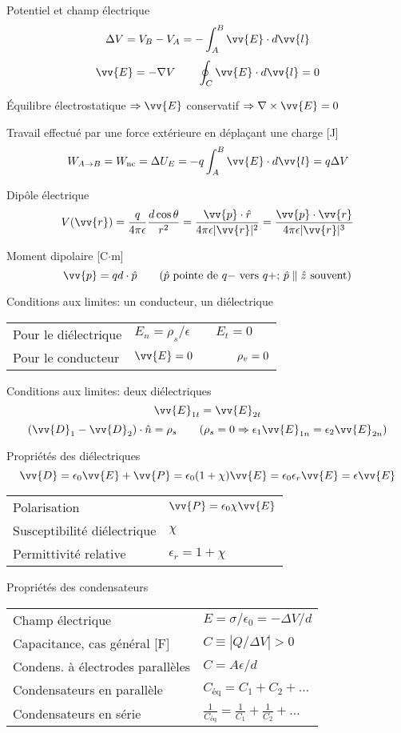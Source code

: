 \documentclass[10pt,landscape]{article}
\newcommand{\extraline}{\vspace{1em}}
\newcommand{\halfline}{\vspace{0.5em}}
\begin{document}
\begin{multicols}{3}
Potentiel et champ électrique
\[ \Delta V = V_B - V_A  = -\int_A^B \vv{E}\cdot d\vv{l} \]
\[ \vv{E} = -\nabla V 
 \qquad \oint_C \vv{E}\cdot d\vv{l}  = 0 \]

Équilibre électrostatique $\Rightarrow \vv{E}$ conservatif  $\Rightarrow \nabla \times \vv{E} = 0$

\extraline
Travail effectué par une force extérieure en déplaçant une charge [J]
\[ W_{A\rightarrow B} = W_\text{nc} = \Delta U_E = -q\int_{A}^{B} \vv{E}\cdot d\vv{l} = q\Delta V \]

Dipôle électrique
\[ V(\vv{r}) = \frac{q}{4\pi\epsilon} \frac{d\cos\theta}{r^2} =
\frac{\vv{p}\cdot\hat{r}}{4\pi\epsilon|\vv{r}|^2} =
\frac{\vv{p}\cdot\vv{r}}{4\pi\epsilon|\vv{r}|^3} \]

Moment dipolaire [C$\cdot$m]
\[ \vv{p} = qd\cdot \hat{p} \qquad \text{($\hat{p}$ pointe de $q-$ vers $q+$;  $\hat{p}\parallel\hat{z}$ souvent)} \]

\halfline
Conditions aux limites: un conducteur, un diélectrique  \\
\halfline
\begin{tabular}{@{}ll@{}}
	Pour le diélectrique & $ E_n = {\rho_s}/{\epsilon} \qquad E_t = 0 $ \\
	Pour le conducteur  & $\vv{E} = 0 \qquad\qquad \rho_v = 0 $ \\
\end{tabular}

\extraline
Conditions aux limites: deux diélectriques
\[ \vv{E}_{1t} =\vv{ E}_{2t}  \]
\[ (\vv{D}_1 - \vv{D}_2) \cdot \hat{n} = \rho_s  \qquad (\rho_s=0 \Rightarrow \epsilon_1 \vv{E}_{1n} = \epsilon_2 \vv{E}_{2n}) \] 

\halfline
Propriétés des diélectriques
\[ \vv{D} = \epsilon_0\vv{E} + \vv{P} = \epsilon_0(1+\chi)\vv{E} = \epsilon_0\epsilon_r\vv{E} = \epsilon\vv{E}  \]
\begin{tabular}{@{}ll@{}}
	Polarisation  & $\vv{P} = \epsilon_0\chi\vv{E}$ \\
	Susceptibilité diélectrique  & $\chi$ \\
	Permittivité relative &  $\epsilon_r=1+\chi$
\end{tabular}

\extraline
Propriétés des condensateurs  \\
\halfline
\begin{tabular}{@{}ll@{}}
	Champ électrique & $ E = {\sigma}/{\epsilon_0}  = -{\Delta V}/{d} $ \\
	Capacitance, cas général [F] & $C \equiv  | {Q}/{\Delta V} | > 0 $ \\
	Condens. à électrodes parallèles & $C = {A\epsilon}/{d} $ \\
	Condensateurs en parallèle  & $C_\text{éq} = C_1 + C_2 + \dots$ \\
	Condensateurs en série & $\frac{1}{C_\text{éq}} = \frac{1}{C_1} + \frac{1}{C_2} + \dots $\\
\end{tabular}



\end{multicols}
\end{document}
